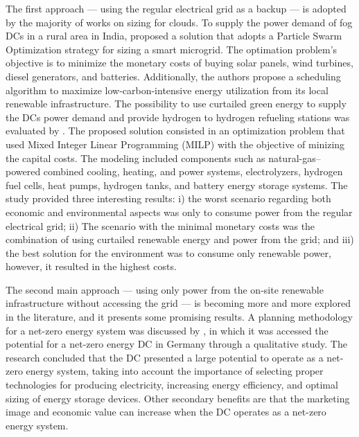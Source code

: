 The first approach --- using the regular electrical grid as a backup --- is adopted by the majority of works on sizing for clouds. To supply the power demand of fog DCs in a rural area in India, \citet{padma2021_fogdcs_rural} proposed a solution that adopts a Particle Swarm Optimization strategy for sizing a smart microgrid. The optimation problem's objective is to minimize the monetary costs of buying solar panels, wind turbines, diesel generators, and batteries. Additionally, the authors propose a scheduling algorithm to maximize low-carbon-intensive energy utilization from its local renewable infrastructure. %
The possibility to use curtailed green energy to supply the DCs power demand and provide hydrogen to hydrogen refueling stations was evaluated by \citet{Niaz2022_curtailment}. The proposed solution consisted in an optimization problem that used Mixed Integer Linear Programming (MILP) with the objective of minizing the capital costs.
The modeling included components such as natural-gas–powered combined cooling, heating, and power systems, electrolyzers, hydrogen fuel cells, heat pumps, hydrogen tanks, and battery energy storage systems. The study provided three interesting results: i) the worst scenario regarding both economic and environmental aspects was only to consume power from the regular electrical grid; ii) The scenario with the minimal monetary costs was the combination of using curtailed renewable energy and power from the grid; and iii) the best solution for the environment was to consume only renewable power, however, it resulted in the highest costs.


The second main approach --- using only power from the on-site renewable infrastructure without accessing the grid --- is becoming more and more explored in the literature, and it presents some promising results. A planning methodology for a net-zero energy system was discussed by \citet{Richter2021_netzero_dcs}, in which it was accessed the potential for a net-zero energy DC in Germany through a qualitative study. The research concluded that the DC presented a large potential to operate as a net-zero energy system, taking into account the importance of selecting proper technologies for producing electricity, increasing energy efficiency, and optimal sizing of energy storage devices. Other secondary benefits are that the marketing image and economic value can increase when the DC operates as a net-zero energy system. 


